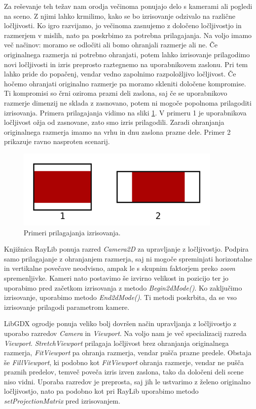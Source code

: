 \documentclass[12pt,a4paper,twoside]{book}
\begin{document}
Za reševanje teh težav nam orodja večinoma ponujajo delo s kamerami ali pogledi na sceno. Z njimi lahko krmilimo, kako se bo izrisovanje odzivalo na različne ločljivosti. Ko igro razvijamo, jo večinoma zasnujemo z določeno ločljivostjo in razmerjem v mislih, nato pa poskrbimo za potrebna prilagajanja. Na voljo imamo več načinov: moramo se odločiti ali bomo ohranjali razmerje ali ne. Če originalnega razmerja ni potrebno ohranjati, potem lahko izrisovanje prilagodimo novi ločljivosti in izris preprosto raztegnemo na uporabnikovem zaslonu. Pri tem lahko pride do popačenj, vendar vedno zapolnimo razpoložljivo ločljivost. Če hočemo ohranjati originalno razmerje pa moramo skleniti določene kompromise. Ti kompromisi so črni oziroma prazni deli zaslona, saj če se uporabnikovo razmerje dimenzij ne sklada z zasnovano, potem ni mogoče popolnoma prilagoditi izrisovanja. Primera prilagajanja vidimo na sliki \ref{slika:prilagajanje}. V primeru 1 je uporabnikova ločljivost ožja od zasnovane, zato smo izris prilagodili. Zaradi ohranjanja originalnega razmerja imamo na vrhu in dnu zaslona prazne dele. Primer 2 prikazuje ravno nasproten scenarij.

\begin{figure}[h]
	\centering
	\includegraphics[width=10cm]{prilagajanje}
	\caption{Primeri prilagajanja izrisovanja.}
	\label{slika:prilagajanje}
\end{figure}

Knjižnica RayLib ponuja razred \textit{Camera2D} za upravljanje z ločljivostjo. Podpira samo prilagajanje z ohranjanjem razmerja, saj ni mogoče spreminjati horizontalne in vertikalne povečave neodvisno, ampak le s skupnim faktorjem preko \textit{zoom} spremenljivke. Kameri nato postavimo še izvirno velikost in pozicijo ter jo uporabimo pred začetkom izrisovanja z metodo \textit{Begin2dMode()}. Ko zaključimo izrisovanje, uporabimo metodo \textit{End2dMode()}. Ti metodi poskrbita, da se vso izrisovanje prilagodi parametrom kamere.

LibGDX ogrodje ponuja veliko bolj dovršen način upravljanja z ločljivostjo z uporabo razredov \textit{Camera} in \textit{Viewport}. Na voljo nam je več specializacij razreda \textit{Viewport}. \textit{StretchViewport} prilagaja ločljivost brez ohranjanja originalnega razmerja, \textit{FitViewport} pa ohranja razmerja, vendar pušča prazne predele. Obstaja še \textit{FillViewport}, ki podobno kot \textit{FitViewport} ohranja razmerje, vendar ne pušča praznih predelov, temveč poveča izris izven zaslona, tako da določeni deli scene niso vidni. Uporaba razredov je preprosta, saj jih le ustvarimo z želeno originalno ločljivostjo, nato pa podobno kot pri RayLib uporabimo metodo \textit{setProjectionMatrix} pred izrisovanjem.
\end{document}
